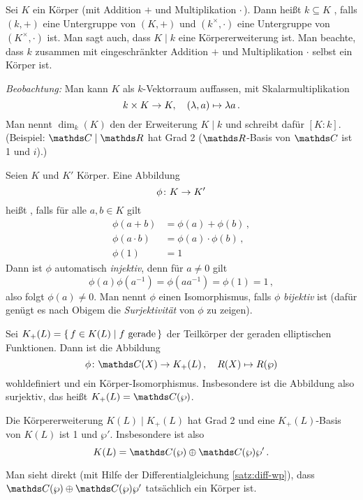 \begin{erin}
Sei $K$ ein Körper (mit Addition $+$ und Multiplikation $\cdot$\,).
Dann heißt $k\subseteq K$ , falls $(k,+)$ eine Untergruppe von $(K,+)$ und $(k^\times,\cdot)$ eine Untergruppe von $(K^\times, \cdot)$ ist.
Man sagt auch, dass $K\mid k$ eine Körpererweiterung ist.
Man beachte, dass $k$ zusammen mit eingeschränkter Addition $+$ und Multiplikation $\cdot$ selbst ein Körper ist.

\emph{Beobachtung:}
Man kann $K$ als $k$-Vektorraum auffassen, mit Skalarmultiplikation
\[
	k\times K\rightarrow K,
	\quad (\lambda,a)\mapsto \lambda a
	\,.
\]
Man nennt $\dim_k(K)$ den  der Erweiterung $K\mid k$ und schreibt dafür $[K:k]$.
(Beispiel: $\CC\mid\RR$ hat Grad 2 ($\RR$-Basis von $\CC$ ist 1 und $i$).)

Seien $K$ und $K'$ Körper.
Eine Abbildung
\[
	\phi\colon K\rightarrow K'
\]
heißt , falls für alle $a, b \in K$ gilt
\begin{align*}
	\phi(a+b) &= \phi(a)+\phi(b)\,, \\
	\phi(a\cdot b) &= \phi(a)\cdot\phi(b)\,, \\
	\phi(1)&=1
\end{align*}
Dann ist $\phi$ automatisch \emph{injektiv}, denn für $a \neq 0$ gilt
\[
	\phi(a)\phi(a^{-1})
	= \phi(a a^{-1})
	= \phi(1)= 1
	\,,
\]
also folgt $\phi(a)\neq 0$.
Man nennt $\phi$ einen Isomorphismus, falls $\phi$ \emph{bijektiv} ist (dafür genügt es nach Obigem die \emph{Surjektivität} von $\phi$ zu zeigen).
\end{erin}

\begin{satz-list}[Struktursatz]
\item Sei $K_+(L) = \left\{\,f\in K(L) \mid f \text{ gerade}\,\right\}$ der Teilkörper der geraden elliptischen Funktionen.
Dann ist die Abbildung
\[
	\phi\colon \CC(X) \ra K_+(L)\,,
	\quad R(X) \mapsto R(\wp)
\]
wohldefiniert und ein Körper-Isomorphismus.
Insbesondere ist die Abbildung also surjektiv, das heißt $K_+(L) = \CC(\wp)$.

\item Die Körpererweiterung $K(L) \mid K_+(L)$ hat Grad 2 und eine $K_+(L)$-Basis von $K(L)$ ist 1 und $\wp'$.
Insbesondere ist also
\[
	K(L)
	= \CC(\wp) \oplus \CC(\wp) \wp'
	\,.
\]
\end{satz-list}

\begin{beme}[Übung]
Man sieht direkt (mit Hilfe der Differentialgleichung \autoref{satz:diff-wp}), dass $\CC(\wp) \oplus \CC(\wp) \wp'$ tatsächlich ein Körper ist.
\end{beme}


